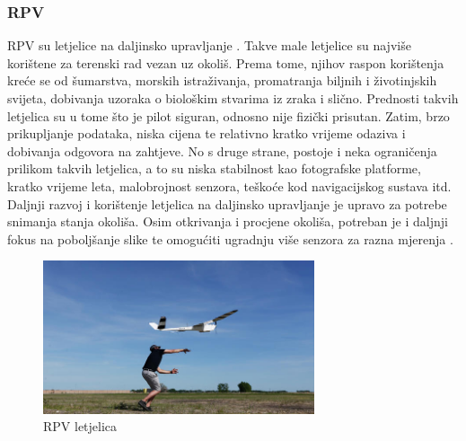 \documentclass[times, utf8, diplomski]{fer}
\begin{document}
\subsubsection{RPV}
RPV su letjelice na daljinsko upravljanje . Takve male letjelice  su  najviše  korištene  za  terenski  rad  vezan  uz  okoliš. Prema  tome,  njihov  raspon korištenja kreće se od šumarstva, morskih istraživanja, promatranja biljnih i životinjskih svijeta, dobivanja uzoraka o biološkim stvarima iz zraka i slično. Prednosti takvih letjelica su u tome što je pilot siguran, odnosno nije fizički prisutan. Zatim, brzo prikupljanje podataka, niska cijena te relativno kratko vrijeme odaziva i dobivanja odgovora na zahtjeve. No s druge strane, postoje i neka ograničenja prilikom takvih letjelica, a to su niska stabilnost kao fotografske platforme, kratko vrijeme leta, malobrojnost senzora, teškoće kod navigacijskog sustava itd. \\
Daljnji razvoj i korištenje letjelica na daljinsko upravljanje je upravo za potrebe snimanja stanja okoliša. Osim otkrivanja i procjene okoliša, potreban je i daljnji fokus na poboljšanje slike te omogućiti ugradnju više senzora za razna mjerenja \citep{Hardin}.
\begin{figure}[htb]
\centering
\includegraphics[width=8cm]{img/RPV.png}
\caption{RPV letjelica\protect\footnotemark}
\label{fig:RPV letjelica}
\end{figure}
\end{document}
